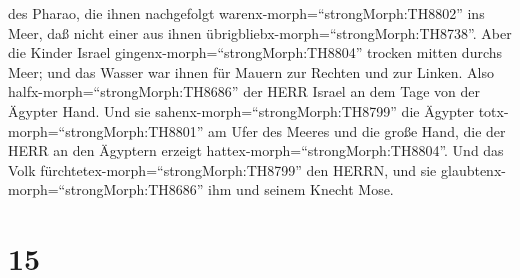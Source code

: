 des Pharao, die ihnen nachgefolgt warenx-morph=``strongMorph:TH8802''
ins Meer, daß nicht einer aus ihnen
übrigbliebx-morph=``strongMorph:TH8738''.  Aber die Kinder
Israel gingenx-morph=``strongMorph:TH8804'' trocken mitten durchs Meer;
und das Wasser war ihnen für Mauern zur Rechten und zur Linken.
 Also halfx-morph=``strongMorph:TH8686'' der HERR Israel an
dem Tage von der Ägypter Hand. Und sie
sahenx-morph=``strongMorph:TH8799'' die Ägypter
totx-morph=``strongMorph:TH8801'' am Ufer des Meeres  und
die große Hand, die der HERR an den Ägyptern erzeigt
hattex-morph=``strongMorph:TH8804''. Und das Volk
fürchtetex-morph=``strongMorph:TH8799'' den HERRN, und sie
glaubtenx-morph=``strongMorph:TH8686'' ihm und seinem Knecht Mose.

\hypertarget{section-14}{%
\section{15}\label{section-14}}

